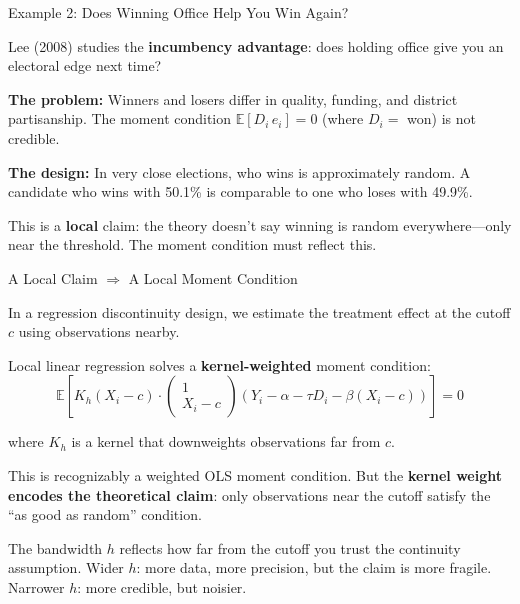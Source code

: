 \documentclass[aspectratio=169, handout, t]{beamer}
\numberwithin{equation}{section}
\begin{document}
\begin{frame}{Example 2: Does Winning Office Help You Win Again?}

Lee (2008) studies the \textbf{incumbency advantage}: does holding office give you an electoral edge next time?

\medskip\pause
\textbf{The problem:} Winners and losers differ in quality, funding, and district partisanship.  The moment condition $\mathbb{E}[D_i \, e_i] = 0$ (where $D_i = $ won) is not credible.

\medskip\pause
\textbf{The design:} In very close elections, who wins is approximately random.  A candidate who wins with 50.1\% is comparable to one who loses with 49.9\%.

\medskip\pause
This is a \textbf{local} claim: the theory doesn't say winning is random everywhere---only near the threshold.  The moment condition must reflect this.

\end{frame}

\begin{frame}{A Local Claim $\Rightarrow$ A Local Moment Condition}

In a regression discontinuity design, we estimate the treatment effect at the cutoff $c$ using observations nearby.

\medskip\pause
Local linear regression solves a \textbf{kernel-weighted} moment condition:
$$\mathbb{E}\!\left[K_h(X_i - c) \cdot
\begin{pmatrix} 1 \\ X_i - c \end{pmatrix}
\!\left(Y_i - \alpha - \tau D_i - \beta(X_i - c)\right)\right] = 0$$

where $K_h$ is a kernel that downweights observations far from $c$.

\medskip\pause
This is recognizably a weighted OLS moment condition.  But the \textbf{kernel weight encodes the theoretical claim}: only observations near the cutoff satisfy the ``as good as random'' condition.

\medskip\pause
The bandwidth $h$ reflects how far from the cutoff you trust the continuity assumption.  Wider $h$: more data, more precision, but the claim is more fragile.  Narrower $h$: more credible, but noisier.

\end{frame}
\end{document}
